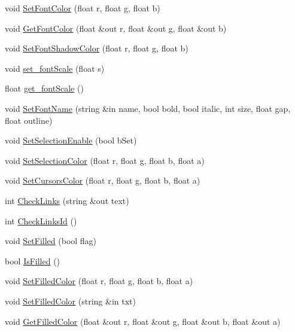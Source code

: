 \begin{DoxyCompactItemize}
\item 
void \hyperlink{class_n_g_u_i_label_rich_aa2bb7a3cb108c0f7e7b3c21c0fdf5547}{Set\+Font\+Color} (float r, float g, float b)
\item 
void \hyperlink{class_n_g_u_i_label_rich_a7be11923a166bd12d00b502020c3819d}{Get\+Font\+Color} (float \&out r, float \&out g, float \&out b)
\item 
void \hyperlink{class_n_g_u_i_label_rich_a69e0e1d2b6981300510793d4b0e819d3}{Set\+Font\+Shadow\+Color} (float r, float g, float b)
\item 
void \hyperlink{class_n_g_u_i_label_rich_a3661fa74eaac9d2dad0e47222b1234eb}{set\+\_\+font\+Scale} (float s)
\item 
float \hyperlink{class_n_g_u_i_label_rich_ac1a30d7a84e860dab05894fdf38b7173}{get\+\_\+font\+Scale} ()
\item 
void \hyperlink{class_n_g_u_i_label_rich_af959af50ffe480587b0f11fc7ffbfdab}{Set\+Font\+Name} (string \&in name, bool bold, bool italic, int size, float gap, float outline)
\item 
void \hyperlink{class_n_g_u_i_label_rich_a835d47c9f63c3d393a81c8526bd43f87}{Set\+Selection\+Enable} (bool b\+Set)
\item 
void \hyperlink{class_n_g_u_i_label_rich_ae9f14bc658c7d8be270481642471024c}{Set\+Selection\+Color} (float r, float g, float b, float a)
\item 
void \hyperlink{class_n_g_u_i_label_rich_ab4b1a1a45b71236ad72cda05b0b40e95}{Set\+Cursors\+Color} (float r, float g, float b, float a)
\item 
int \hyperlink{class_n_g_u_i_label_rich_a371feb0210cf68e0f7635737bc2f72a6}{Check\+Links} (string \&out text)
\item 
int \hyperlink{class_n_g_u_i_label_rich_accc7c441c037d2ded2c314b58cace71a}{Check\+Links\+Id} ()
\item 
void \hyperlink{class_n_g_u_i_label_rich_af49550633b4f260f94ad1591d9e7f48e}{Set\+Filled} (bool flag)
\item 
bool \hyperlink{class_n_g_u_i_label_rich_a5d7e2a345f21e04bcd5d51f9ebcb4654}{Is\+Filled} ()
\item 
void \hyperlink{class_n_g_u_i_label_rich_a598776b12528d3c1f26fe6d492295f2a}{Set\+Filled\+Color} (float r, float g, float b, float a)
\item 
void \hyperlink{class_n_g_u_i_label_rich_ab9bd5410fcccdd234106484b488d2fc7}{Set\+Filled\+Color} (string \&in txt)
\item 
void \hyperlink{class_n_g_u_i_label_rich_a8c2c5ebbe0ea2b3fd6799e8c5ae8ebd5}{Get\+Filled\+Color} (float \&out r, float \&out g, float \&out b, float \&out a)

\end{DoxyCompactItemize}
